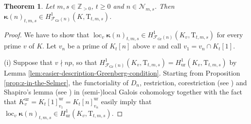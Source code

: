 \documentclass[12pt,reqno]{amsart}
\newtheorem{theorem}{Theorem}[section]
\theoremstyle{definition}
\theoremstyle{remark}
\newcommand{\numberset}{\mathbb}
\newcommand{\Z}{\numberset{Z}}
\newcommand{\T}{\boldsymbol{\mathrm{T}}}
\DeclareMathOperator{\loc}{loc}
\newcommand{\Gr}{\mathrm{Gr}}
\newcommand{\ur}{\mathrm{ur}}
\begin{document}
\begin{theorem}\label{thm:kolyvagin-classes-lie-in-the-Selmer}
    Let $m,s\in\Z_{>0}$, $t\ge0$ and $n\in\mathcal{N}_{m,s}$. Then $\boldsymbol{\kappa}(n)_{t,m,s}\in H^1_{\mathcal{F}_{\Gr}(n)}(K,\T_{t,m,s})$.
\end{theorem}
\begin{proof}
    We have to show that $\loc_v\boldsymbol{\kappa}(n)_{t,m,s}\in H^1_{\mathcal{F}_{\Gr}(n)}(K_v,\T_{t,m,s})$ for every prime $v$ of $K$. Let $v_n$ be a prime of $K_t[n]$ above $v$ and call $v_1=v_n\cap K_t[1]$.

    (i) Suppose that $v\nmid np$, so that $H^1_{\mathcal{F}_{\Gr}(n)}(K_v,\T_{t,m,s})=H^1_{\ur}(K_v,\T_{t,m,s})$ by Lemma \ref{lem:easier-description-Greenberg-condition}. Starting from Proposition \ref{prop:z-in-the-Selmer}, the functoriality of $D_n$, restriction, corestriction (see \cite[§1.5]{Neukirch-Schmidt-Wingberg:cohomology-of-number-fields}) and Shapiro's lemma (see \cite[§3.1.2]{Skinner-Urban:Iwasawa.main-conjecture-for-GL2}) in (semi-)local Galois cohomology together with the fact that $K_v^{\ur}=K_t[1]_{v_1}^{\ur}=K_t[n]_{v_n}^{\ur}$ easily imply that $\loc_v\boldsymbol{\kappa}(n)_{t,m,s}\in H^1_{\ur}(K_v,\T_{t,m,s})$.


\end{proof}
\end{document}
